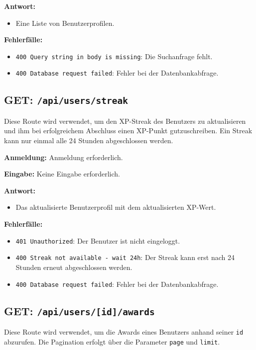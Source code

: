 \documentclass[a4paper,12pt]{article}
\begin{document}
\textbf{Antwort:}
\begin{itemize}
    \item Eine Liste von Benutzerprofilen.
\end{itemize}

\textbf{Fehlerfälle:}
\begin{itemize}
    \item \texttt{400 Query string in body is missing}:
        Die Suchanfrage fehlt.
    \item \texttt{400 Database request failed}:
        Fehler bei der Datenbankabfrage.
\end{itemize}

\subsection{GET: \texttt{/api/users/streak}}

Diese Route wird verwendet, um den XP-Streak des Benutzers zu aktualisieren und
ihm bei erfolgreichem Abschluss einen XP-Punkt gutzuschreiben. Ein Streak kann
nur einmal alle 24 Stunden abgeschlossen werden.

\textbf{Anmeldung:} Anmeldung erforderlich.

\textbf{Eingabe:} Keine Eingabe erforderlich.

\textbf{Antwort:}
\begin{itemize}
    \item Das aktualisierte Benutzerprofil mit dem aktualisierten XP-Wert.
\end{itemize}

\textbf{Fehlerfälle:}
\begin{itemize}
    \item \texttt{401 Unauthorized}:
        Der Benutzer ist nicht eingeloggt.
    \item \texttt{400 Streak not available - wait 24h}:
        Der Streak kann erst nach 24 Stunden erneut abgeschlossen werden.
    \item \texttt{400 Database request failed}:
        Fehler bei der Datenbankabfrage.
\end{itemize}

\newpage
\subsection{GET: \texttt{/api/users/[id]/awards}}

Diese Route wird verwendet, um die Awards eines Benutzers anhand seiner
\texttt{id} abzurufen. Die Pagination erfolgt über die Parameter \texttt{page}
und \texttt{limit}.
\end{document}
